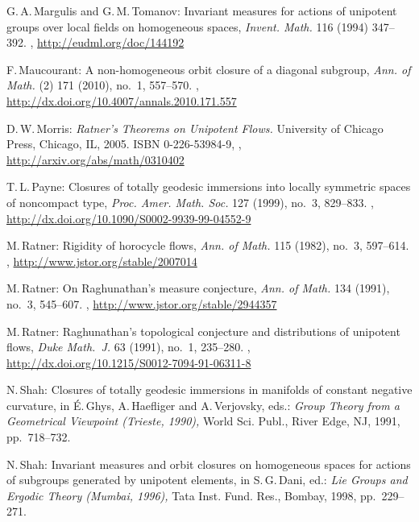 \begin{references}{99}
G.\,A.\,Margulis and G.\,M.\,Tomanov:
Invariant measures for actions of unipotent groups over local fields on homogeneous spaces,
\emph{Invent. Math.} 116 (1994) 347--392.
,
\maynewline
\url{http://eudml.org/doc/144192}

F.\,Maucourant:
A non-homogeneous orbit closure of a diagonal subgroup,
\emph{Ann. of Math.} (2) 171 (2010), no.~1, 557--570.
 ,
 \maynewline
 \url{http://dx.doi.org/10.4007/annals.2010.171.557}

D.\,W.\,Morris:
\emph{Ratner's Theorems on Unipotent Flows.}
University of Chicago Press, Chicago, IL, 2005.
ISBN 0-226-53984-9,
,
\maynewline
\url{http://arxiv.org/abs/math/0310402}

T.\,L.\,Payne:
Closures of totally geodesic immersions into locally symmetric spaces of noncompact type,
\emph{Proc. Amer. Math. Soc.}  127  (1999),  no.~3, 829--833.
,
\maynewline
\url{http://dx.doi.org/10.1090/S0002-9939-99-04552-9}

M.\,Ratner:
Rigidity of horocycle flows,
\emph{Ann. of Math.} 115  (1982), no.~3, 597--614. 
,
\maynewline
\url{http://www.jstor.org/stable/2007014}

M.\,Ratner:
On Raghunathan's measure conjecture,
\emph{Ann. of Math.} 134 (1991), no.~3, 545--607. 
,
\maynewline
\url{http://www.jstor.org/stable/2944357}

M.\,Ratner:
Raghunathan's topological conjecture and distributions of unipotent flows,
\emph{Duke Math.~J.} 63 (1991), no.~1, 235--280. 
,
\maynewline
\url{http://dx.doi.org/10.1215/S0012-7094-91-06311-8}

N.\,Shah:
Closures of totally geodesic immersions in manifolds of constant negative curvature,
in \'E.\,Ghys, A.\,Haefliger and A.\,Verjovsky, eds.:
\emph{Group Theory from a Geometrical Viewpoint (Trieste, 1990),}
World Sci. Publ., River Edge, NJ, 1991, pp.~718--732.

N.\,Shah:
Invariant measures and orbit closures on homogeneous spaces for actions of subgroups generated by unipotent elements,
in S.\,G.\,Dani, ed.:
\emph{Lie Groups and Ergodic Theory (Mumbai, 1996),}
Tata Inst. Fund. Res., Bombay, 1998,
pp.~229--271.


\end{references}

